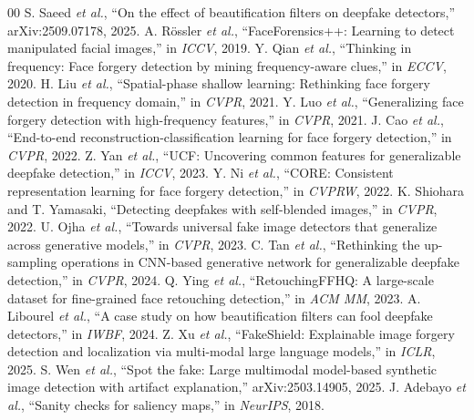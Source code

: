 \documentclass[conference]{IEEEtran}
\begin{document}
\clearpage
\begin{thebibliography}{00}
 S. Saeed \emph{et al.}, ``On the effect of beautification filters on deepfake detectors,'' arXiv:2509.07178, 2025.
 A. R\"ossler \emph{et al.}, ``FaceForensics++: Learning to detect manipulated facial images,'' in \emph{ICCV}, 2019.
 Y. Qian \emph{et al.}, ``Thinking in frequency: Face forgery detection by mining frequency-aware clues,'' in \emph{ECCV}, 2020.
 H. Liu \emph{et al.}, ``Spatial-phase shallow learning: Rethinking face forgery detection in frequency domain,'' in \emph{CVPR}, 2021.
 Y. Luo \emph{et al.}, ``Generalizing face forgery detection with high-frequency features,'' in \emph{CVPR}, 2021.
 J. Cao \emph{et al.}, ``End-to-end reconstruction-classification learning for face forgery detection,'' in \emph{CVPR}, 2022.
 Z. Yan \emph{et al.}, ``UCF: Uncovering common features for generalizable deepfake detection,'' in \emph{ICCV}, 2023.
 Y. Ni \emph{et al.}, ``CORE: Consistent representation learning for face forgery detection,'' in \emph{CVPRW}, 2022.
 K. Shiohara and T. Yamasaki, ``Detecting deepfakes with self-blended images,'' in \emph{CVPR}, 2022.
 U. Ojha \emph{et al.}, ``Towards universal fake image detectors that generalize across generative models,'' in \emph{CVPR}, 2023.
 C. Tan \emph{et al.}, ``Rethinking the up-sampling operations in CNN-based generative network for generalizable deepfake detection,'' in \emph{CVPR}, 2024.
 Q. Ying \emph{et al.}, ``RetouchingFFHQ: A large-scale dataset for fine-grained face retouching detection,'' in \emph{ACM MM}, 2023.
 A. Libourel \emph{et al.}, ``A case study on how beautification filters can fool deepfake detectors,'' in \emph{IWBF}, 2024.
 Z. Xu \emph{et al.}, ``FakeShield: Explainable image forgery detection and localization via multi-modal large language models,'' in \emph{ICLR}, 2025.
 S. Wen \emph{et al.}, ``Spot the fake: Large multimodal model-based synthetic image detection with artifact explanation,'' arXiv:2503.14905, 2025.
 J. Adebayo \emph{et al.}, ``Sanity checks for saliency maps,'' in \emph{NeurIPS}, 2018.

\end{thebibliography}
\end{document}
